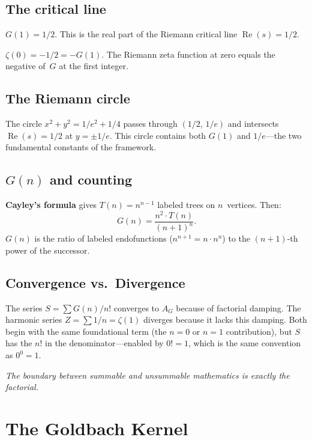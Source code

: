 \documentclass[11pt,a4paper]{article}
\theoremstyle{definition}
\theoremstyle{remark}
\newcommand{\AG}{A_G}
\begin{document}
\subsection{The critical line}

$G(1) = 1/2$. This is the real part of the Riemann critical line $\operatorname{Re}(s)=1/2$.

$\zeta(0) = -1/2 = -G(1)$. The Riemann zeta function at zero equals the negative of~$G$ at the first integer.

\subsection{The Riemann circle}

The circle $x^{2}+y^{2}=1/e^{2}+1/4$ passes through $(1/2,\,1/e)$ and intersects $\operatorname{Re}(s)=1/2$ at $y=\pm 1/e$. This circle contains both $G(1)$ and $1/e$---the two fundamental constants of the framework.

\subsection{\texorpdfstring{$G(n)$}{G(n)} and counting}

\textbf{Cayley's formula} gives $T(n)=n^{n-1}$ labeled trees on $n$~vertices. Then:
\begin{equation}\label{eq:cayleycount}
  G(n) = \frac{n^{2}\cdot T(n)}{(n+1)^{n}}.
\end{equation}
$G(n)$ is the ratio of labeled endofunctions ($n^{n+1}=n\cdot n^{n}$) to the $(n+1)$-th power of the successor.

\subsection{Convergence vs.\ Divergence}

The series $S=\sum G(n)/n!$ converges to $\AG$ because of factorial damping. The harmonic series $Z=\sum 1/n = \zeta(1)$ diverges because it lacks this damping. Both begin with the same foundational term (the $n=0$ or $n=1$ contribution), but $S$ has the $n!$ in the denominator---enabled by $0!=1$, which is the same convention as $0^{0}=1$.

\medskip
\emph{The boundary between summable and unsummable mathematics is exactly the factorial.}

\section{The Goldbach Kernel}\label{sec:goldbach}
\end{document}
